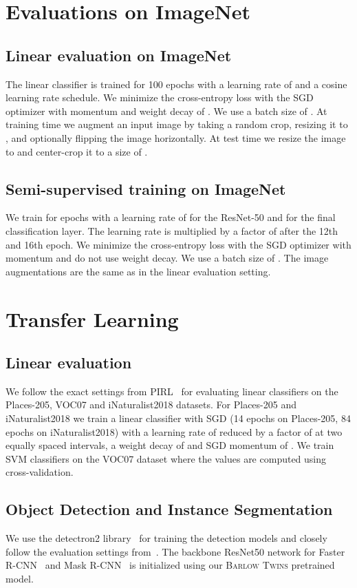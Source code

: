 \documentclass{article}
\newcommand{\AlgoName}{\textsc{Barlow Twins}}
\begin{document}
\section{Evaluations on ImageNet}

\subsection{Linear evaluation on ImageNet}
\label{sec:linear_evaluation}
The linear classifier is trained for 100 epochs with a learning rate of  and a cosine learning rate schedule. We minimize the cross-entropy loss with the SGD optimizer with momentum and weight decay of . We use a batch size of . At training time we augment an input image by taking a random crop, resizing it to , and optionally flipping the image horizontally. At test time we resize the image to  and center-crop it to a size of .

\subsection{Semi-supervised training on ImageNet}
\label{sec:semisupervised_evaluation}
We train for  epochs with a learning rate of  for the ResNet-50 and  for the final classification layer. The learning rate is multiplied by a factor of  after the 12th and 16th epoch. We minimize the cross-entropy loss with the SGD optimizer with momentum and do not use weight decay. We use a batch size of . The image augmentations are the same as in the linear evaluation setting.

\section{Transfer Learning}

\subsection{Linear evaluation} We follow the exact settings from PIRL~\cite{misra2019self} for evaluating linear classifiers on the Places-205, VOC07 and iNaturalist2018 datasets. For Places-205 and iNaturalist2018 we train a linear classifier with SGD (14 epochs on Places-205, 84 epochs on iNaturalist2018) with a learning rate of  reduced by a factor of  at two equally spaced intervals, a weight decay of  and SGD momentum of . We train SVM classifiers on the VOC07 dataset where the  values are computed using cross-validation.

\subsection{Object Detection and Instance Segmentation}
We use the detectron2 library~\cite{wu2019detectron2} for training the detection models and closely follow the evaluation settings from~\cite{he2019momentum}. The backbone ResNet50 network for Faster R-CNN~\cite{ren2015faster} and Mask R-CNN~\cite{he2017mask} is initialized using our \AlgoName{} pretrained model.
\end{document}
